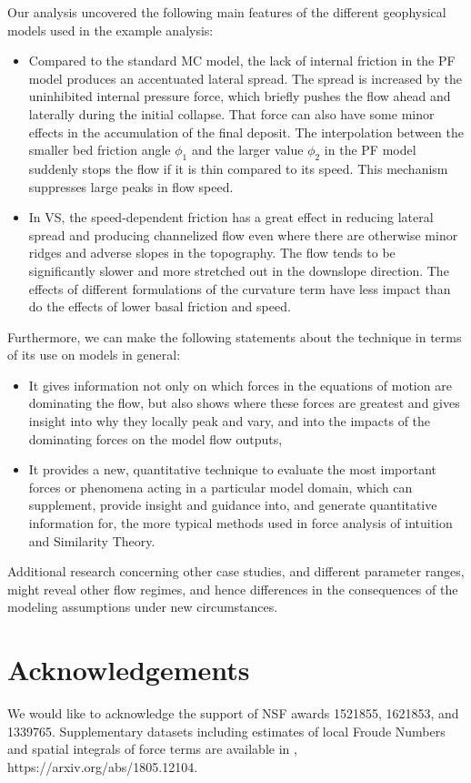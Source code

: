 \documentclass{article}
\begin{document}
Our analysis uncovered the following main features of the different geophysical models used in the example analysis:
\begin{itemize}
  \item Compared to the standard MC model, the lack of internal friction in the PF model produces an accentuated lateral spread. The spread is increased by the uninhibited internal pressure force, which briefly pushes the flow ahead and laterally during the initial collapse. That force can also have some minor effects in the accumulation of the final deposit. The interpolation between the smaller bed friction angle $\phi_1$ and the larger value $\phi_2$ in the PF model suddenly stops the flow if it is thin compared to its speed. This mechanism suppresses large peaks in flow speed.
  \item In VS, the speed-dependent friction has a great effect in reducing lateral spread and producing channelized flow even where there are otherwise minor ridges and adverse slopes in the topography. The flow tends to be significantly slower and more stretched out in the downslope direction. The effects of different formulations of the curvature term have less impact than do the effects of lower basal friction and speed.
\end{itemize}

Furthermore, we can make the following statements about the technique in terms of its use on models in general:
\begin{itemize}
\item It gives information not only on which forces in the equations of motion are dominating the flow, but also shows where these forces are greatest and gives insight into why they locally peak and vary, and into the impacts of the dominating forces on the model flow outputs,
\item It provides a new, quantitative technique to evaluate the most important forces or phenomena acting in a particular model domain, which can supplement, provide insight and guidance into, and generate quantitative information for, the more typical methods used in force analysis of intuition and Similarity Theory.
\end{itemize}

Additional research concerning other case studies, and different parameter ranges, might reveal other flow regimes, and hence differences in the consequences of the modeling assumptions under new circumstances.

\section*{Acknowledgements}
We would like to acknowledge the support of NSF awards 1521855, 1621853, and 1339765. Supplementary datasets including estimates of local Froude Numbers and spatial integrals of force terms are available in \cite{Patra2018}, https://arxiv.org/abs/1805.12104.
\end{document}
